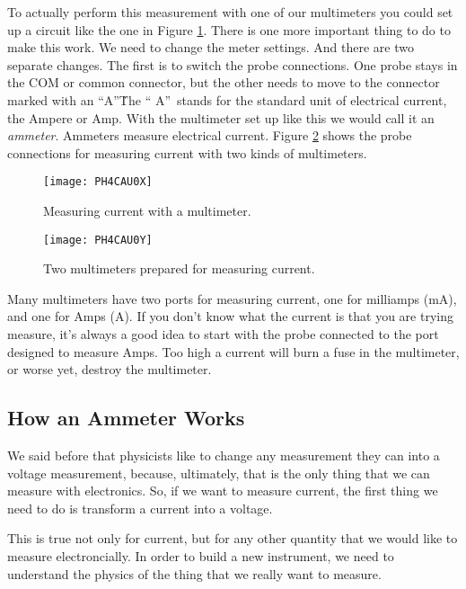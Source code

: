 To actually perform this measurement with one of our
multimeters you could set up a circuit like the one in Figure
\ref{fig:measuring_current_b}. 
There is one more important thing
to do to make this work. We need to change the meter settings. And there are
two separate changes. The first is to switch the probe connections. One
probe stays in the COM or common connector, but the other needs to move to
the connector marked with an \textquotedblleft A\textquotedblright\. 
The \textquotedblleft
A\textquotedblright\ stands for the standard unit of electrical current, the
Ampere or Amp. With the multimeter set up like this we would call it an 
\emph{ammeter}. Ammeters measure electrical current.
Figure \ref{fig:multimeters_amps} shows the probe connections for measuring
current with two kinds of multimeters. 
\begin{figure}[htbp!]
\centering
\texttt{[image: PH4CAU0X]}
\caption[Measuring current with a multimeter]{Measuring current with a
multimeter.}
\label{fig:measuring_current_b}
\end{figure}
\begin{figure}[htbp!]
\centering
\texttt{[image: PH4CAU0Y]}
\caption[Two multimeters prepared for measuring current]{Two multimeters
prepared for measuring current.}
\label{fig:multimeters_amps}
\end{figure}

Many
multimeters have two ports for measuring current, one for milliamps (mA), and
one for Amps (A). If you don't know what the current is that you are trying 
measure, it's always a good idea to start with the probe connected to the port
designed to measure Amps. Too high a current will burn a fuse in the 
multimeter, or worse yet, destroy the multimeter.

\subsection{How an Ammeter Works}

We said before that physicists like to change any measurement they can into
a voltage measurement, because, ultimately, that is the only thing that we
can measure with electronics. So, if we want to measure current, the first
thing we need to do is transform a current into a voltage.

This is true not only for current, but for any other quantity that we would
like to measure electroncially. 
In order to build a new instrument, we need to understand the physics of the 
thing that we really want to measure. 

